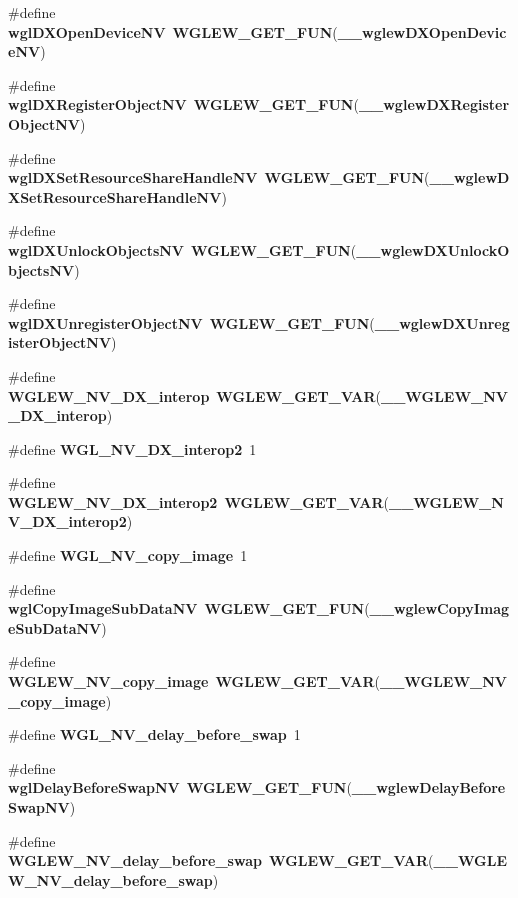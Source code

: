 \begin{DoxyCompactItemize}
\item 
\#define {\bf wgl\+D\+X\+Open\+Device\+NV}~{\bf W\+G\+L\+E\+W\+\_\+\+G\+E\+T\+\_\+\+F\+UN}({\bf \+\_\+\+\_\+wglew\+D\+X\+Open\+Device\+NV})
\item 
\#define {\bf wgl\+D\+X\+Register\+Object\+NV}~{\bf W\+G\+L\+E\+W\+\_\+\+G\+E\+T\+\_\+\+F\+UN}({\bf \+\_\+\+\_\+wglew\+D\+X\+Register\+Object\+NV})
\item 
\#define {\bf wgl\+D\+X\+Set\+Resource\+Share\+Handle\+NV}~{\bf W\+G\+L\+E\+W\+\_\+\+G\+E\+T\+\_\+\+F\+UN}({\bf \+\_\+\+\_\+wglew\+D\+X\+Set\+Resource\+Share\+Handle\+NV})
\item 
\#define {\bf wgl\+D\+X\+Unlock\+Objects\+NV}~{\bf W\+G\+L\+E\+W\+\_\+\+G\+E\+T\+\_\+\+F\+UN}({\bf \+\_\+\+\_\+wglew\+D\+X\+Unlock\+Objects\+NV})
\item 
\#define {\bf wgl\+D\+X\+Unregister\+Object\+NV}~{\bf W\+G\+L\+E\+W\+\_\+\+G\+E\+T\+\_\+\+F\+UN}({\bf \+\_\+\+\_\+wglew\+D\+X\+Unregister\+Object\+NV})
\item 
\#define {\bf W\+G\+L\+E\+W\+\_\+\+N\+V\+\_\+\+D\+X\+\_\+interop}~{\bf W\+G\+L\+E\+W\+\_\+\+G\+E\+T\+\_\+\+V\+AR}({\bf \+\_\+\+\_\+\+W\+G\+L\+E\+W\+\_\+\+N\+V\+\_\+\+D\+X\+\_\+interop})
\item 
\#define {\bf W\+G\+L\+\_\+\+N\+V\+\_\+\+D\+X\+\_\+interop2}~1
\item 
\#define {\bf W\+G\+L\+E\+W\+\_\+\+N\+V\+\_\+\+D\+X\+\_\+interop2}~{\bf W\+G\+L\+E\+W\+\_\+\+G\+E\+T\+\_\+\+V\+AR}({\bf \+\_\+\+\_\+\+W\+G\+L\+E\+W\+\_\+\+N\+V\+\_\+\+D\+X\+\_\+interop2})
\item 
\#define {\bf W\+G\+L\+\_\+\+N\+V\+\_\+copy\+\_\+image}~1
\item 
\#define {\bf wgl\+Copy\+Image\+Sub\+Data\+NV}~{\bf W\+G\+L\+E\+W\+\_\+\+G\+E\+T\+\_\+\+F\+UN}({\bf \+\_\+\+\_\+wglew\+Copy\+Image\+Sub\+Data\+NV})
\item 
\#define {\bf W\+G\+L\+E\+W\+\_\+\+N\+V\+\_\+copy\+\_\+image}~{\bf W\+G\+L\+E\+W\+\_\+\+G\+E\+T\+\_\+\+V\+AR}({\bf \+\_\+\+\_\+\+W\+G\+L\+E\+W\+\_\+\+N\+V\+\_\+copy\+\_\+image})
\item 
\#define {\bf W\+G\+L\+\_\+\+N\+V\+\_\+delay\+\_\+before\+\_\+swap}~1
\item 
\#define {\bf wgl\+Delay\+Before\+Swap\+NV}~{\bf W\+G\+L\+E\+W\+\_\+\+G\+E\+T\+\_\+\+F\+UN}({\bf \+\_\+\+\_\+wglew\+Delay\+Before\+Swap\+NV})
\item 
\#define {\bf W\+G\+L\+E\+W\+\_\+\+N\+V\+\_\+delay\+\_\+before\+\_\+swap}~{\bf W\+G\+L\+E\+W\+\_\+\+G\+E\+T\+\_\+\+V\+AR}({\bf \+\_\+\+\_\+\+W\+G\+L\+E\+W\+\_\+\+N\+V\+\_\+delay\+\_\+before\+\_\+swap})

\end{DoxyCompactItemize}
